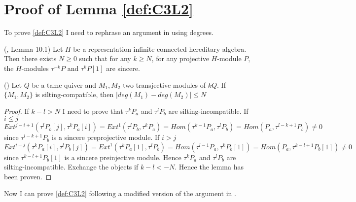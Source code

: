 \section{Proof of Lemma \ref{def:C3L2}}
\indent To prove \ref{def:C3L2} I need to rephrase an argument in \cite{BDP13} using degrees.
\begin{lemma}
(\cite{BDP13}, Lemma 10.1) Let $H$ be a representation-infinite connected hereditary algebra. Then there exists $N\geq 0$ such that for any $k\geq N$, for any projective $H$-module $P$, the $H$-modules $\tau^{-k}P$ and $\tau^kP[1]$ are sincere.
\end{lemma}
\begin{lemma}
(\cite{BDP13}) Let $Q$ be a tame quiver and $M_1,M_2$ two transjective modules of $kQ$. If $\{M_1,M_2\}$ is silting-compatible, then $|deg(M_1)-deg(M_2)|\leq N$ 
\end{lemma}
\begin{proof}
If $k-l>N$ I need to prove that $\tau^kP_a$ and $\tau^lP_b$ are silting-incompatible. If $i\leq j$ $Ext^{j-i+1}(\tau^lP_b[j],\tau^kP_a[i])=Ext^1(\tau^lP_b,\tau^kP_a)=Hom(\tau^{k-1}P_a,\tau^l P_b)=Hom(P_a,\tau^{l-k+1}P_b)\neq 0$ since $\tau^{l-k+1}P_b$ is a sincere preprojective module. If $i>j$ $Ext^{i-j}(\tau^kP_a[i],\tau^lP_b[j])=Ext^1(\tau^kP_a[1],\tau^lP_b)=Hom(\tau^{l-1}P_a,\tau^k P_b[1])=Hom(P_a,\tau^{k-l+1}P_b[1])\neq 0$ since $\tau^{k-l+1}P_b[1]$ is a sincere preinjective module. Hence $\tau^kP_a$ and $\tau^lP_b$ are silting-incompatible. Exchange the objects if $k-l<-N$. Hence the lemma has been proven.
\end{proof}
\indent Now I can prove \ref{def:C3L2} following a modified version of the argument in \cite{BDP13}.
